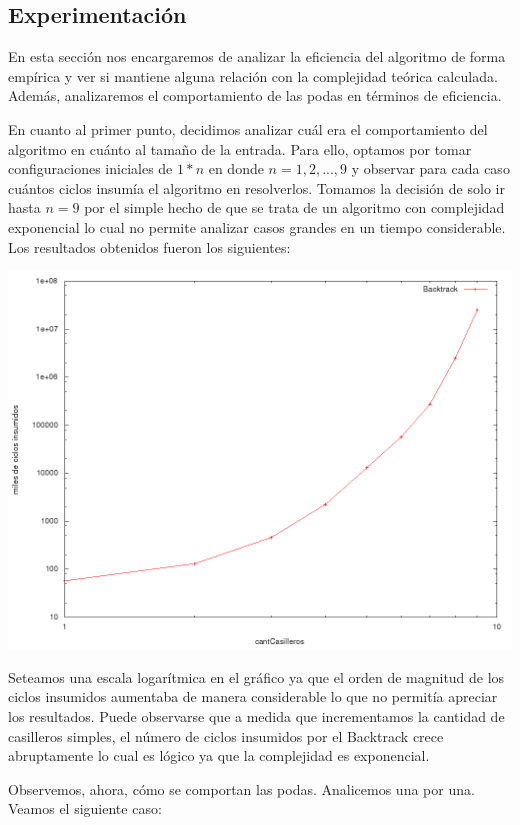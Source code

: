 \subsection{Experimentación}

En esta sección nos encargaremos de analizar la eficiencia del algoritmo de forma empírica y ver si mantiene alguna relación con la complejidad teórica calculada. Además, analizaremos el comportamiento de las podas en términos de eficiencia.

En cuanto al primer punto, decidimos analizar cuál era el comportamiento del algoritmo en cuánto al tamaño de la entrada. Para ello, optamos por tomar configuraciones iniciales de $1*n$ en donde $n=1,2,...,9$ y observar para cada caso cuántos ciclos insumía el algoritmo en resolverlos. Tomamos la decisión de solo ir hasta $n=9$ por el simple hecho de que se trata de un algoritmo con complejidad exponencial lo cual no permite analizar casos grandes en un tiempo considerable. Los resultados obtenidos fueron los siguientes:

\includegraphics[scale=0.3]{ej3/imgs/ej3-1.png}

Seteamos una escala logarítmica en el gráfico ya que el orden de magnitud de los ciclos insumidos aumentaba de manera considerable lo que no permitía apreciar los resultados. Puede observarse que a medida que incrementamos la cantidad de casilleros simples, el número de ciclos insumidos por el Backtrack crece abruptamente lo cual es lógico ya que la complejidad es exponencial.

Observemos, ahora, cómo se comportan las podas. Analicemos una por una. Veamos el siguiente caso:

